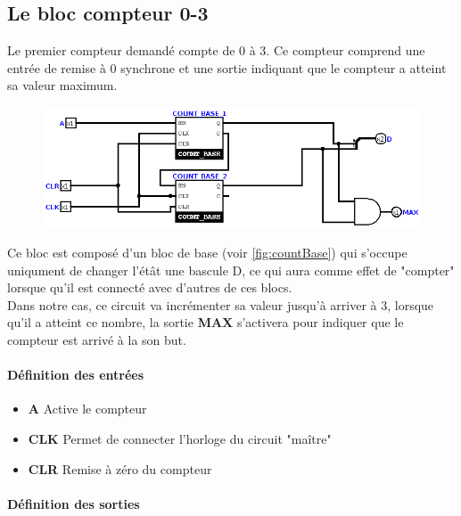 \documentclass[a4paper]{article} %
\begin{document}
\subsection{Le bloc compteur 0-3}
Le premier compteur demandé compte de 0 à 3. Ce compteur comprend une entrée de remise à 0 synchrone et une sortie indiquant que le compteur a atteint sa valeur maximum.
\begin{tcolorbox}[colframe=Monokaimagenta,colback=white]
\begin{figure}[H]
\centering
    \includegraphics[width=1\textwidth]{src/COUNT_4BITS.png}
    \label{fig:count4bits}
\end{figure}
Ce bloc est composé d'un bloc de base (voir \ref{fig:countBase}) qui s'occupe uniqument de changer l'étât une bascule D, ce qui aura comme effet de "compter" lorsque qu'il est connecté avec d'autres de ces blocs.\\
Dans notre cas, ce circuit va incrémenter sa valeur jusqu'à arriver à $3$, lorsque qu'il a atteint ce nombre, la sortie \textbf{MAX} s'activera pour indiquer que le compteur est arrivé à la son but.

\paragraph{Définition des entrées}
\begin{itemize}

    \item     \textbf{A} Active le compteur
    \item     \textbf{CLK} Permet de connecter l'horloge du circuit "maître"
    \item     \textbf{CLR} Remise à zéro du compteur
\end{itemize}

\paragraph{Définition des sorties}
\begin{itemize}


\end{itemize}
\end{tcolorbox}
\end{document}
